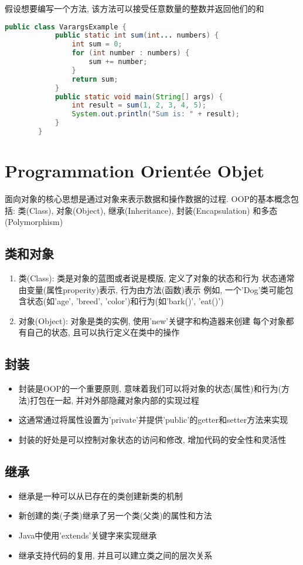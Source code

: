\documentclass{article}
\begin{document}
假设想要编写一个方法, 该方法可以接受任意数量的整数并返回他们的和
\begin{tcolorbox}
    \begin{lstlisting}[language=java]
        public class VarargsExample {
            public static int sum(int... numbers) {
                int sum = 0;
                for (int number : numbers) {
                    sum += number;
                }
                return sum;
            }
            public static void main(String[] args) {
                int result = sum(1, 2, 3, 4, 5);
                System.out.println("Sum is: " + result);
            }
        }
    \end{lstlisting}
\end{tcolorbox}
\section{ Programmation Orientée Objet}
面向对象的核心思想是通过对象来表示数据和操作数据的过程. OOP的基本概念包括: 类(Class), 对象(Object), 继承(Inheritance), 封装(Encapsulation) 和多态(Polymorphism)
\subsection{ 类和对象}
\begin{enumerate}
    \item 类(Class):
    \subitem 类是对象的蓝图或者说是模版, 定义了对象的状态和行为
    \subitem 状态通常由变量(属性properity)表示, 行为由方法(函数)表示
    \subitem 例如, 一个'Dog'类可能包含状态(如'age', 'breed', 'color')和行为(如'bark()', 'eat()')
    \item 对象(Object):
    \subitem 对象是类的实例, 使用'new'关键字和构造器来创建
    \subitem 每个对象都有自己的状态, 且可以执行定义在类中的操作
\end{enumerate}
\subsection{ 封装}
\begin{itemize}
    \item 封装是OOP的一个重要原则, 意味着我们可以将对象的状态(属性)和行为(方法)打包在一起, 并对外部隐藏对象内部的实现过程
    \item 这通常通过将属性设置为'private'并提供'public'的getter和setter方法来实现
    \item 封装的好处是可以控制对象状态的访问和修改, 增加代码的安全性和灵活性
\end{itemize}
\subsection{ 继承}
\begin{itemize}
    \item 继承是一种可以从已存在的类创建新类的机制
    \item 新创建的类(子类)继承了另一个类(父类)的属性和方法
    \item Java中使用'extends'关键字来实现继承
    \item 继承支持代码的复用, 并且可以建立类之间的层次关系
\end{itemize}
\end{document}
